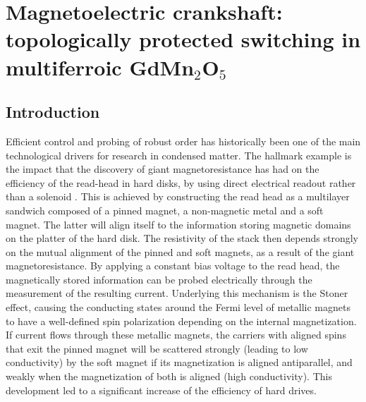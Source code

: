 \newcommand{\Jpar}{J_{||}}
\newcommand{\Jperp}{J_{\perp}}
\chapter{Magnetoelectric crankshaft: topologically protected switching in multiferroic GdMn$_2$O$_5$ \label{ch:GdMn2O5}}
\section{Introduction}
Efficient control and probing of robust order has historically been one of the main technological drivers for research in condensed matter.
The hallmark example is the impact that the discovery of giant magnetoresistance has had on the efficiency of the read-head in hard disks, by using direct electrical readout rather than a solenoid \cite{Baibich1988,Binasch1989,Tsymbal2001,Nunez2006TheoryMetals,Chappert2007}.
This is achieved by constructing the read head as a multilayer sandwich composed of a pinned magnet, a non-magnetic metal and a soft magnet.
The latter will align itself to the information storing magnetic domains on the platter of the hard disk.
The resistivity of the stack then depends strongly on the mutual alignment of the pinned and soft magnets, as a result of the giant magnetoresistance.
By applying a constant bias voltage to the read head, the magnetically stored information can be probed electrically through the measurement of the resulting current.
Underlying this mechanism is the Stoner effect, causing the conducting states around the Fermi level of metallic magnets to have a well-defined spin polarization depending on the internal magnetization.
If current flows through these metallic magnets, the carriers with aligned spins that exit the pinned magnet will be scattered strongly (leading to low conductivity) by the soft magnet if its magnetization is aligned antiparallel, and weakly when the magnetization of both is aligned (high conductivity).
This development led to a significant increase of the efficiency of hard drives.

